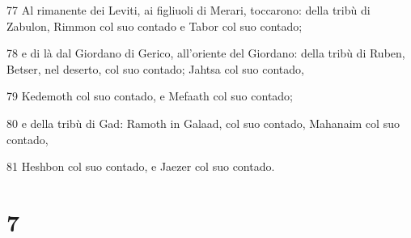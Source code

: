 \par 77 Al rimanente dei Leviti, ai figliuoli di Merari, toccarono: della tribù di Zabulon, Rimmon col suo contado e Tabor col suo contado;
\par 78 e di là dal Giordano di Gerico, all'oriente del Giordano: della tribù di Ruben, Betser, nel deserto, col suo contado; Jahtsa col suo contado,
\par 79 Kedemoth col suo contado, e Mefaath col suo contado;
\par 80 e della tribù di Gad: Ramoth in Galaad, col suo contado, Mahanaim col suo contado,
\par 81 Heshbon col suo contado, e Jaezer col suo contado.

\chapter{7}


